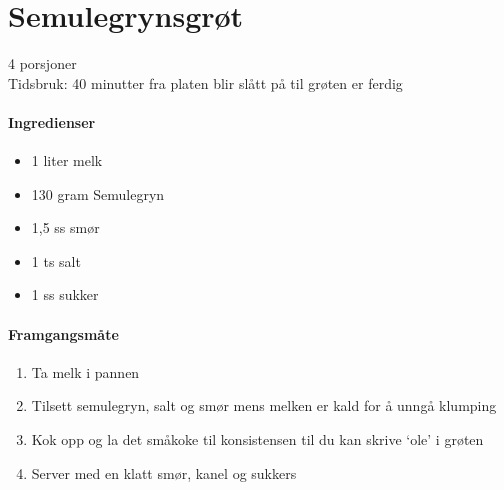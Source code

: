 \section{Semulegrynsgrøt}
4 porsjoner\\
Tidsbruk: 40 minutter fra platen blir slått på til grøten er ferdig

\paragraph{Ingredienser}
\begin{itemize}[noitemsep]
	\item 1 liter melk
	\item 130 gram Semulegryn
	\item 1,5 ss smør
	\item 1 ts salt
	\item 1 ss sukker
\end{itemize}

\paragraph{Framgangsmåte}
\begin{enumerate}[noitemsep]
	\item Ta melk i pannen
	\item Tilsett semulegryn, salt og smør mens melken er kald for å unngå klumping
	\item Kok opp og la det småkoke til konsistensen til du kan skrive `ole' i grøten
	\item Server med en klatt smør, kanel og sukkers
\end{enumerate}

